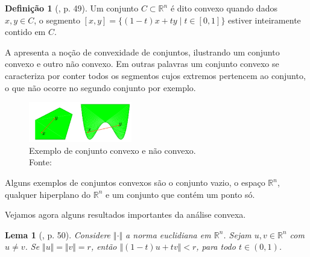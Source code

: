 \documentclass[12pt,a4paper]{scrartcl}
\def\RR{\mathds{R}}
\newtheorem{lema}{Lema}
\theoremstyle{definition}%
\newtheorem{defi}{Definição}
\begin{document}
\begin{defi} [\textcite{Ademir2013}, p. 49]
Um conjunto $C \subset \RR^{n}$ é dito convexo quando dados $x,y \in C$, o segmento $[x,y] = \{ (1-t)x + ty \mid t\in [0,1] \}$ estiver inteiramente contido em $C$.
\end{defi}

A  apresenta a noção de convexidade de conjuntos, ilustrando um conjunto convexo e outro não convexo. Em outras palavras um conjunto convexo se caracteriza por conter todos os segmentos cujos extremos pertencem ao conjunto, o que não ocorre no segundo conjunto por exemplo.

\begin{figure}[!h] 
	\centering
	\includegraphics[width=0.40\textwidth]{conjunto_convexo}
	\caption{ Exemplo de conjunto convexo e não convexo. \label{fig_conjuntos_convexos} \\ Fonte: \textcite{Evelin2017}}
\end{figure}

Alguns exemplos de conjuntos convexos são o conjunto vazio, o espaço $\RR^{n}$, qualquer hiperplano do $\RR^{n}$ e um conjunto que contém um ponto só.

Vejamos agora alguns resultados importantes da análise convexa.

\begin{lema}[\textcite{Ademir2013}, p. 50]
Considere $\Vert \cdot \Vert$ a norma euclidiana em $\RR^{n}$. Sejam $u,v \in \RR^{n}$ com $u\neq v$. Se $\Vert u \Vert = \Vert v \Vert = r$, então $\Vert (1-t)u + tv \Vert < r$, para todo $t \in (0,1)$.
\end{lema}
\end{document}
